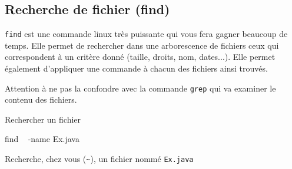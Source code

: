 \documentclass[a4paper,11pt]{article}
\begin{document}
	\subsection{Recherche de fichier (find)}
		\verb_find_ est une commande linux tr\`es puissante qui vous fera gagner beaucoup de temps.
		Elle permet de rechercher dans une arborescence de fichiers ceux qui correspondent \`a un crit\`ere donn\'e (taille, droits, nom, dates...).
		Elle permet \'egalement d'appliquer une commande \`a chacun des fichiers ainsi trouv\'es.
			
           	\par
        
		Attention \`a ne pas la confondre avec la commande \verb_grep_ qui va examiner le contenu des fichiers.
			
            	\par
	
		\begin{Tutoriel}{Rechercher un fichier} 
		
		        \begin{Console}
				find ~ -name Ex.java
			\end{Console}
			\begin{steps}
				\item Recherche, chez vous (\verb_~_), un fichier nomm\'e \verb_Ex.java_
			\end{steps}
		\end{Tutoriel}
            	\par
        
\end{document}
